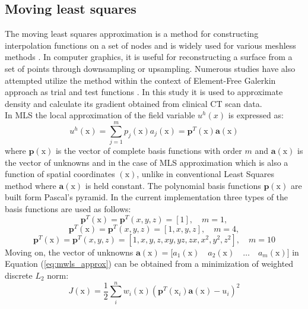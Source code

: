 \documentclass[11pt]{ACMEarticle}
\numberwithin{equation}{section}
\begin{document}
\subsection{Moving least squares}
\label{sec:mwls}
The moving least squares approximation is a method for constructing interpolation functions on a set of nodes and is widely used for various meshless methods \citep{belytschko1996meshless}. In computer graphics, it is useful for reconstructing a surface from a set of points \citep{lancaster1981surfaces} through  downsampling or upsampling. Numerous studies have also attempted utilize the method within the context of Element-Free Galerkin approach as trial and test functions \citep{belytschko1996dynamic,wong2010meshfree, ullah2013finite}. In this study it is used to approximate density and calculate its gradient obtained from clinical CT scan data. \\
In MLS the local approximation of the field variable $u^h(x)$ is expressed as: 
\begin{equation}
u^h(\mathrm{ x} )=\sum^m_{j=1}p_j(\mathrm{ x} )a_j(\mathrm{ x} ) =\mathbf p^T(\mathrm{ x} )\mathbf a(\mathrm{ x} )
\label{eq:mwls_approx}
\end{equation}
where $\mathbf p(\mathrm x)$ is the vector of complete basis functions with order $m$ and $\mathbf a(\mathrm x)$ is the vector of unknowns and in the case of MLS approximation which is also a function of spatial coordinates $(\mathrm x)$, unlike in conventional Least Squares method where $\mathbf a(\mathrm x)$ is held constant. The polynomial basis functions $\mathbf p(\mathrm x)$ are built form Pascal's pyramid. In the current implementation three types of the basis functions are used as follows:
\begin{equation*}
\mathbf p^T\mathrm{ (x)}  = \mathbf p^T(x,y,z)= [1], \quad m=1,
\end{equation*}
\begin{equation*}
\mathbf p^T \mathrm{ (x)} = \mathbf p^T(x,y,z)= [1,x,y,z], \quad m=4,
\end{equation*}
\begin{equation}\label{eq:mwls_basis}
\mathbf p^T\mathrm{ (x)}  = \mathbf p^T(x,y,z)= [1,x,y,z,xy,yz,zx,x^2,y^2,z^2], \quad m=10
\end{equation}
Moving on, the vector of unknowns $\mathbf a(\mathrm x) = \Big[ a_1(\mathrm x )\quad a_2(\mathrm x )\quad\dots \quad a_m(\mathrm x ) \Big]$ in Equation (\ref{eq:mwls_approx}) can be obtained from a minimization of weighted discrete $L_2$ norm:
\begin{equation}
J({\mathrm x})=\frac{1}{2} \sum_i^n w_i({\mathrm x}) \left( \mathbf p^T (\mathrm x_i)\mathbf a(\mathrm x) - u_i \right)^2
\label{eq:mwls_l2}
\end{equation}
\end{document}
